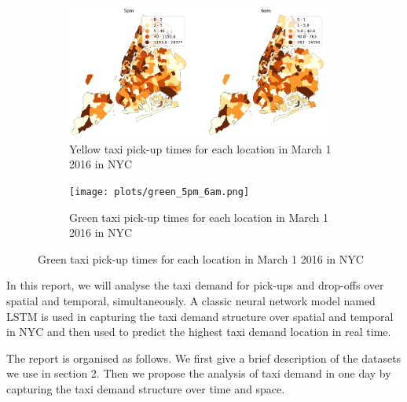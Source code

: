 \documentclass[11pt]{article}
\begin{document}
\begin{figure}[t]
\centering
\begin{minipage}{0.85\linewidth}
\begin{subfigure}{\linewidth}
\includegraphics[width=0.95\textwidth]{plots/yellow_5pm_6am.png}
\centering
\caption{Yellow taxi pick-up times for each location in March 1 2016 in NYC}
\label{Fig:demand_loc_6am}
\end{subfigure}
\end{minipage}
\begin{minipage}{0.85\linewidth}
\begin{subfigure}{\linewidth}
\centering
\texttt{[image: plots/green\_5pm\_6am.png]}
\centering
\caption{Green taxi pick-up times for each location in March 1 2016 in NYC}
\label{Fig:demand_loc_6am}
\end{subfigure}
\end{minipage}
\end{figure}



In this report, we will analyse the taxi demand for pick-ups and drop-offs over spatial and temporal, simultaneously. A classic neural network model named LSTM \cite{sak2014long} is used in capturing the taxi demand structure over spatial and temporal in NYC and then used to predict the highest taxi demand location in real time.

The report is organised as follows. We first give a brief description of the datasets we use in section 2. Then we propose the analysis of taxi demand in one day by capturing the taxi demand structure over time and space.



\end{document}
